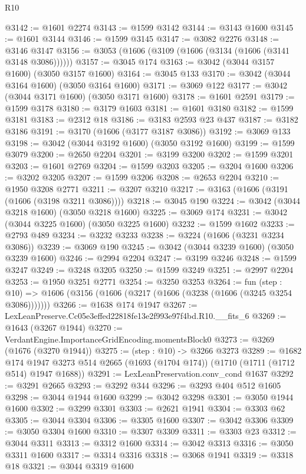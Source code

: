 \begin{lexlean}{R10}
\begin{coremodule}
@3142 := @1601 @2274
@3143 := @1599 @3142
@3144 := @3143 @1600
@3145 := @1601 @3144
@3146 := @1599 @3145
@3147 := @3082 @2276
@3148 := @3146 @3147
@3156 := @3053 (@1606 (@3109 (@1606 (@3134 (@1606 (@3141 @3148 @3086))))))
@3157 := @3045 @174
@3163 := @3042 (@3044 @3157 @1600) (@3050 @3157 @1600)
@3164 := @3045 @133
@3170 := @3042 (@3044 @3164 @1600) (@3050 @3164 @1600)
@3171 := @3069 @122
@3177 := @3042 (@3044 @3171 @1600) (@3050 @3171 @1600)
@3178 := @1601 @2591
@3179 := @1599 @3178
@3180 := @3179 @1603
@3181 := @1601 @3180
@3182 := @1599 @3181
@3183 := @2312 @18
@3186 := @3183 @2593 @23 @437
@3187 := @3182 @3186
@3191 := @3170 (@1606 (@3177 @3187 @3086))
@3192 := @3069 @133
@3198 := @3042 (@3044 @3192 @1600) (@3050 @3192 @1600)
@3199 := @1599 @3079
@3200 := @2650 @2204
@3201 := @3199 @3200
@3202 := @1599 @3201
@3203 := @1601 @2769
@3204 := @1599 @3203
@3205 := @3204 @1600
@3206 := @3202 @3205
@3207 := @1599 @3206
@3208 := @2653 @2204
@3210 := @1950 @3208 @2771
@3211 := @3207 @3210
@3217 := @3163 (@1606 (@3191 (@1606 (@3198 @3211 @3086))))
@3218 := @3045 @190
@3224 := @3042 (@3044 @3218 @1600) (@3050 @3218 @1600)
@3225 := @3069 @174
@3231 := @3042 (@3044 @3225 @1600) (@3050 @3225 @1600)
@3232 := @1599 @1602
@3233 := @2793 @489
@3234 := @3232 @3233
@3238 := @3224 (@1606 (@3231 @3234 @3086))
@3239 := @3069 @190
@3245 := @3042 (@3044 @3239 @1600) (@3050 @3239 @1600)
@3246 := @2994 @2204
@3247 := @3199 @3246
@3248 := @1599 @3247
@3249 := @3248 @3205
@3250 := @1599 @3249
@3251 := @2997 @2204
@3253 := @1950 @3251 @2771
@3254 := @3250 @3253
@3264 := fun (step : @10) =>
  @1606 (@3156 (@1606 (@3217 (@1606 (@3238 (@1606 (@3245 @3254 @3086)))))))
@3266 := @1638 @174 @1947
@3267 := LexLeanPreserve.Cc05e3effed22818fe13e2f993e97f4bd.R10.__fits_6
@3269 := @1643 (@3267 @1944)
@3270 := VerdantEngine.ImportanceGridEncoding.momentsBlock0
@3273 := @3269 (@1676 (@3270 @1944))
@3275 := (step : @10) -> @3266 @3273
@3289 := @1682
    @174
    @1947
    @3273
    @514
    @2665
    (@1693 (@1704 @174))
    (@1710 (@1711 (@1712 @514) @1947 @1688))
@3291 := LexLeanPreservation.conv_cond @1637
@3292 := @3291 @2665
@3293 := @3292 @344
@3296 := @3293 @404 @512 @1605
@3298 := @3044 @1944 @1600
@3299 := @3042 @3298
@3301 := @3050 @1944 @1600
@3302 := @3299 @3301
@3303 := @2621 @1941
@3304 := @3303 @62
@3305 := @3044 @3304
@3306 := @3305 @1600
@3307 := @3042 @3306
@3309 := @3050 @3304 @1600
@3310 := @3307 @3309
@3311 := @3303 @23
@3312 := @3044 @3311
@3313 := @3312 @1600
@3314 := @3042 @3313
@3316 := @3050 @3311 @1600
@3317 := @3314 @3316
@3318 := @3068 @1941
@3319 := @3318 @18
@3321 := @3044 @3319 @1600

\end{coremodule}
\end{lexlean}
